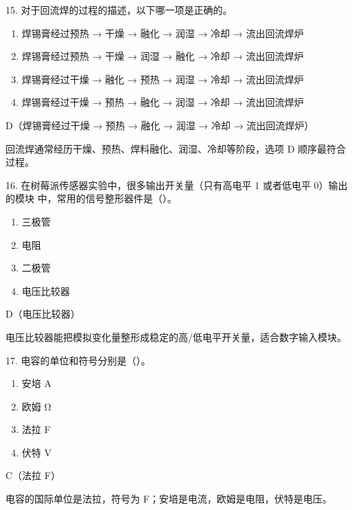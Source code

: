 \begin{question}{15. 对于回流焊的过程的描述，以下哪一项是正确的。}
\begin{enumerate}[label=\Alph*., leftmargin=2.4em, itemsep=0.2em]
\item 焊锡膏经过预热 → 干燥 → 融化 → 润湿 → 冷却 → 流出回流焊炉
\item 焊锡膏经过预热 → 干燥 → 润湿 → 融化 → 冷却 → 流出回流焊炉
\item 焊锡膏经过干燥 → 融化 → 预热 → 润湿 → 冷却 → 流出回流焊炉
\item 焊锡膏经过干燥 → 预热 → 融化 → 润湿 → 冷却 → 流出回流焊炉
\end{enumerate}
\end{question}
\begin{answer}
D（焊锡膏经过干燥 → 预热 → 融化 → 润湿 → 冷却 → 流出回流焊炉）
\end{answer}
\begin{explanation}
回流焊通常经历干燥、预热、焊料融化、润湿、冷却等阶段，选项 D 顺序最符合过程。
\end{explanation}

\begin{question}{16. 在树莓派传感器实验中，很多输出开关量（只有高电平 1 或者低电平 0）输出的模块 中，常用的信号整形器件是（）。}
\begin{enumerate}[label=\Alph*., leftmargin=2.4em, itemsep=0.2em]
\item 三极管
\item 电阻
\item 二极管
\item 电压比较器
\end{enumerate}
\end{question}
\begin{answer}
D（电压比较器）
\end{answer}
\begin{explanation}
电压比较器能把模拟变化量整形成稳定的高/低电平开关量，适合数字输入模块。
\end{explanation}

\begin{question}{17. 电容的单位和符号分别是（）。}
\begin{enumerate}[label=\Alph*., leftmargin=2.4em, itemsep=0.2em]
\item 安培 A
\item 欧姆 Ω
\item 法拉 F
\item 伏特 V
\end{enumerate}
\end{question}
\begin{answer}
C（法拉 F）
\end{answer}
\begin{explanation}
电容的国际单位是法拉，符号为 F；安培是电流，欧姆是电阻，伏特是电压。
\end{explanation}

